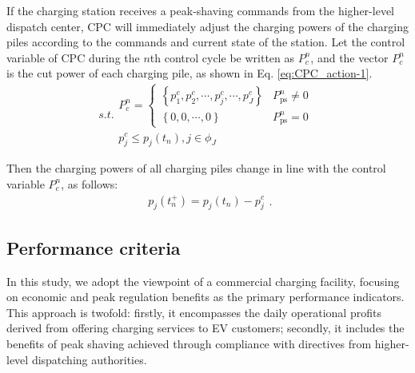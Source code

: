\documentclass[preprint,12pt]{elsarticle}
\begin{document}
If the charging station receives a peak-shaving commands from the higher-level dispatch center, CPC will immediately adjust the charging powers of the charging piles according to the commands and current state of the station. Let the control variable of CPC during the $n$th control cycle be written as $P_{c}^{n}$, and the vector $P_{c}^{n}$ is the cut power of each charging pile, as shown in Eq. \ref{eq:CPC_action-1}.
\begin{equation}
s.t.\begin{array}{c}
P_{c}^{n}=\begin{cases}
\left\{ p_{1}^{c},p_{2}^{c},\cdots,p_{j}^{c},\cdots,p_{J}^{c}\right\}  & P_{\textrm{ps}}^{n}\neq0\\
\left\{ 0,0,\cdots,0\right\}  & P_{\textrm{ps}}^{n}=0
\end{cases}\\
p_{j}^{c}\leq p_{j}(t_{n}),j\in\phi_{J}
\end{array}\label{eq:CPC_action-1}
\end{equation}

Then the charging powers of all charging piles change in line with the control variable $P_{c}^{n}$, as follows:
\begin{equation}
\begin{array}{c}
p_{j}(t_{n}^{+})=p_{j}(t_{n})-p_{j}^{c}\end{array}.\label{eq:CPC_action}
\end{equation}

\subsection{Performance criteria}

In this study, we adopt the viewpoint of a commercial charging facility, focusing on economic and peak regulation benefits as the primary performance indicators. This approach is twofold: firstly, it encompasses the daily operational profits derived from offering charging services to EV customers; secondly, it includes the benefits of peak shaving
achieved through compliance with directives from higher-level dispatching authorities.
\end{document}
